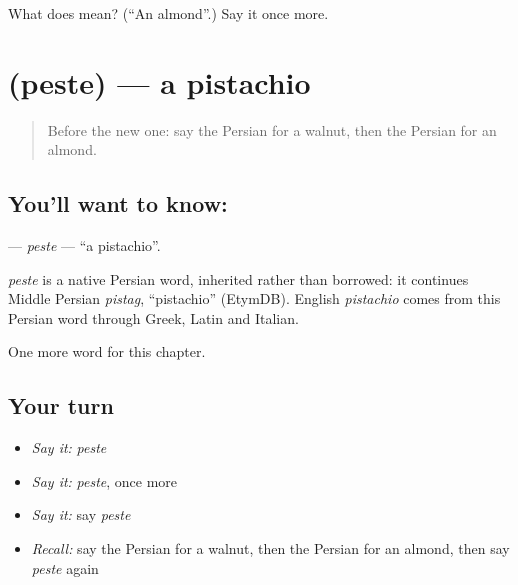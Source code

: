 \begin{tcolorbox}[breakable,colback=teal!4,colframe=teal!35!black,title={Before you move on}]
What does  mean? (\textquotedblleft{}An almond\textquotedblright{}.) Say it once more.
\end{tcolorbox}
\section[\texorpdfstring{\fa{پسته} (peste)}{پسته (peste)}]{ (peste) — a pistachio}

\label{lesson:FA-C101-peste}



\begin{quote}
Before the new one: say the Persian for a walnut, then the Persian for an almond.
\end{quote}

\subsection*{You'll want to know: }
\textbf{} — \emph{peste} — \textquotedblleft{}a pistachio\textquotedblright{}.

\begin{cousinweb}
\emph{peste} is a native Persian word, inherited rather than borrowed: it continues Middle Persian \emph{pistag}, \textquotedblleft{}pistachio\textquotedblright{} (EtymDB). English \emph{pistachio} comes from this Persian word through Greek, Latin and Italian.
\end{cousinweb}

\begin{grammarlens}[title={What you've built}]
One more word for this chapter.
\end{grammarlens}

\subsection*{Your turn}
\begin{itemize}
\raggedright
  \item \emph{Say it:} \emph{peste}
  \item \emph{Say it:} \emph{peste}, once more
  \item \emph{Say it:} say \emph{peste}
  \item \emph{Recall:} say the Persian for a walnut, then the Persian for an almond, then say \emph{peste} again
\end{itemize}

